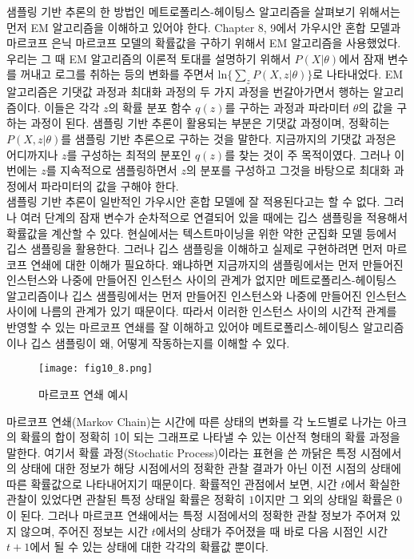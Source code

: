 \documentclass[a4paper]{oblivoir}
\begin{document}
샘플링 기반 추론의 한 방법인 메트로폴리스-헤이팅스 알고리즘을 살펴보기 위해서는 먼저 EM 알고리즘을 이해하고 있어야 한다. Chapter 8, 9에서 가우시안 혼합 모델과 마르코프 은닉 마르코프 모델의 확률값을 구하기 위해서 EM 알고리즘을 사용했었다. 우리는 그 때 EM 알고리즘의 이론적 토대를 설명하기 위해서 $P(X|\theta)$에서 잠재 변수를 꺼내고 로그를 취하는 등의 변화를 주면서 $\textrm{ln} \{ \sum_{z} P(X, z|\theta) \}$로 나타내었다. EM 알고리즘은 기댓값 과정과 최대화 과정의 두 가지 과정을 번갈아가면서 행하는 알고리즘이다. 이들은 각각 $z$의 확률 분포 함수 $q(z)$를 구하는 과정과 파라미터 $\theta$의 값을 구하는 과정이 된다. 샘플링 기반 추론이 활용되는 부분은 기댓값 과정이며, 정확히는 $P(X, z|\theta)$를 샘플링 기반 추론으로 구하는 것을 말한다. 지금까지의 기댓값 과정은 어디까지나 $z$를 구성하는 최적의 분포인 $q(z)$를 찾는 것이 주 목적이였다. 그러나 이번에는 $z$를 지속적으로 샘플링하면서 $z$의 분포를 구성하고 그것을 바탕으로 최대화 과정에서 파라미터의 값을 구해야 한다. \\

샘플링 기반 추론이 일반적인 가우시안 혼합 모델에 잘 적용된다고는 할 수 없다. 그러나 여러 단계의 잠재 변수가 순차적으로 연결되어 있을 때에는 깁스 샘플링을 적용해서 확률값을 계산할 수 있다. 현실에서는 텍스트마이닝을 위한 약한 군집화 모델 등에서 깁스 샘플링을 활용한다. 그러나 깁스 샘플링을 이해하고 실제로 구현하려면 먼저 마르코프 연쇄에 대한 이해가 필요하다. 왜냐하면 지금까지의 샘플링에서는 먼저 만들어진 인스턴스와 나중에 만들어진 인스턴스 사이의 관계가 없지만 메트로폴리스-헤이팅스 알고리즘이나 깁스 샘플링에서는 먼저 만들어진 인스턴스와 나중에 만들어진 인스턴스 사이에 나름의 관계가 있기 때문이다. 따라서 이러한 인스턴스 사이의 시간적 관계를 반영할 수 있는 마르코프 연쇄를 잘 이해하고 있어야 메트로폴리스-헤이팅스 알고리즘이나 깁스 샘플링이 왜, 어떻게 작동하는지를 이해할 수 있다. \\

\begin{figure}[ht] \centering 
\texttt{[image: fig10\_8.png]} 
\caption{마르코프 연쇄 예시}
\label{fig:10-8}
\end{figure}  
마르코프 연쇄(Markov Chain)는 시간에 따른 상태의 변화를 각 노드별로 나가는 아크의 확률의 합이 정확히 1이 되는 그래프로 나타낼 수 있는 이산적 형태의 확률 과정을 말한다. 여기서 확률 과정(Stochatic Process)이라는 표현을 쓴 까닭은 특정 시점에서의 상태에 대한 정보가 해당 시점에서의 정확한 관찰 결과가 아닌 이전 시점의 상태에 따른 확률값으로 나타내어지기 때문이다. 확률적인 관점에서 보면, 시간 $t$에서 확실한 관찰이 있었다면 관찰된 특정 상태일 확률은 정확히 $1$이지만 그 외의 상태일 확률은 $0$이 된다. 그러나 마르코프 연쇄에서는 특정 시점에서의 정확한 관찰 정보가 주어져 있지 않으며, 주어진 정보는 시간 $t$에서의 상태가 주어졌을 때 바로 다음 시점인 시간 $t+1$에서 될 수 있는 상태에 대한 각각의 확률값 뿐이다. \\
 
\end{document}
